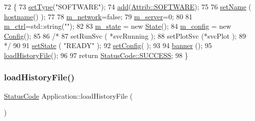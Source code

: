 \begin{DoxyCode}
72                                      \{
73   \hyperlink{classObject_aae534cc9d982bcb9b99fd505f2e103a5}{setType}(\textcolor{stringliteral}{"SOFTWARE"});
74   \hyperlink{classAttrib_a235f773af19c900264a190b00a3b4ad7}{add}(\hyperlink{classAttrib_a69e171d7cc6417835a5a306d3c764235a103a67cd0b8f07ef478fa45d4356e27b}{Attrib::SOFTWARE});
75 
76   \hyperlink{classObject_ae30fea75683c2d149b6b6d17c09ecd0c}{setName} ( \hyperlink{classApplication_a095248805e26b553466b7fafc6517d8f}{hostname}() );
77 
78   \hyperlink{classApplication_a7dc2bb72356cd9186eaad49eb506995a}{m\_network}=\textcolor{keyword}{false};
79   \hyperlink{classApplication_a5e6085b0f322d5036177b16113a75b56}{m\_server}=0;
80 
81   \hyperlink{classApplication_aa371ed989ed34038df400c4d1b41b37f}{m\_ctrl}=std::string(\textcolor{stringliteral}{""});
82 
83   \hyperlink{classApplication_a0ef9832e2d286716e597a1ff21ffcab4}{m\_state}  = \textcolor{keyword}{new} \hyperlink{classState}{State}();
84   \hyperlink{classApplication_ae05f3e253ea871a194c3d30fd1d3b0c3}{m\_config} = \textcolor{keyword}{new} \hyperlink{classConfig}{Config}();
85 
86   \textcolor{comment}{/*}
87 \textcolor{comment}{    setRunSvc ( *svcRunning );
}
88 \textcolor{comment}{    setPlotSvc (*svcPlot );
}
89 \textcolor{comment}{  */}
90 
91   \hyperlink{classApplication_a4a86c9bbf7851753c7b2bc03211092fb}{setState} ( \textcolor{stringliteral}{"READY"} );
92   \hyperlink{classApplication_a46614964f765fd5374b216582b599bcb}{setConfig}( );
93 
94   \hyperlink{classApplication_af168aa3579262d65adc0bd4531361a53}{banner}  ();
95   \hyperlink{classApplication_ab5d46fc4784a4c821e974f5a47ec933d}{loadHistoryFile}();
96 
97   \textcolor{keywordflow}{return} \hyperlink{classStatusCode_a6f565cbeadc76d14c72f047e5e85eb4badd0da38d3ba0d922efd1f4619bc37ad8}{StatusCode::SUCCESS};
98 \}
\end{DoxyCode}
\mbox{\label{classApplication_ab5d46fc4784a4c821e974f5a47ec933d}} 
\subsubsection{\texorpdfstring{load\+History\+File()}{loadHistoryFile()}}
{\footnotesize\ttfamily \hyperlink{classStatusCode}{Status\+Code} Application\+::load\+History\+File (\begin{DoxyParamCaption}{ }\end{DoxyParamCaption})}

